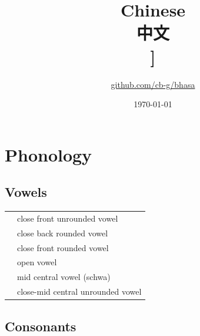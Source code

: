 \documentclass{article}
\title{Chinese\\{\cjkfont 中文}\\\ipa{[\t{\:t\:s}UNw@n}]}
\author{\href{https://github.com/cb-g/bhasa}{github.com/cb-g/bhasa}}
\date{\today}
\begin{document}
\pagecolor{custom_bg}\color{custom_fg}
\maketitle\thispagestyle{empty}

\newpage\setcounter{page}{1}\section{Phonology}

\subsection{Vowels}

\begin{xltabular}{\textwidth}{lL}
   & close front unrounded vowel \\
   & close back rounded vowel \\
   & close front rounded vowel \\
   & open vowel \\
   & mid central vowel (schwa) \\
  \ipa{\textrevepsilon} & close-mid central unrounded vowel \\
\end{xltabular}

\subsection{Consonants}
\end{document}

